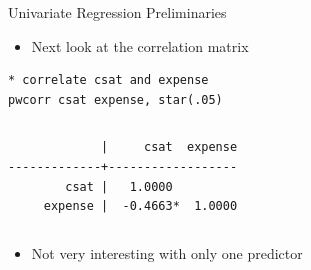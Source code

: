 \documentclass[table,smaller]{beamer}
\begin{document}
\begin{frame}[fragile,label=sec-2-4]{Univariate Regression Preliminaries}
 \begin{itemize}
\item Next look at the correlation matrix
\end{itemize}

\begin{verbatim}
* correlate csat and expense
pwcorr csat expense, star(.05)
\end{verbatim}

\vspace{-.5em}
\begin{columns}
\begin{block}{}
\begin{verbatim}
             |     csat  expense
-------------+------------------
        csat |   1.0000 
     expense |  -0.4663*  1.0000
\end{verbatim}
\end{block}
\end{columns}
\vspace{.5em}



\begin{itemize}
\item Not very interesting with only one predictor
\end{itemize}
\end{frame}
\end{document}
